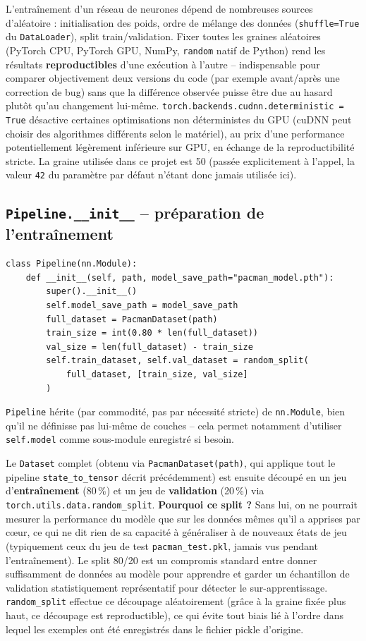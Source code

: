 \documentclass[a4paper,12pt]{article}
\begin{document}
L'entraînement d'un réseau de neurones dépend de nombreuses sources
d'aléatoire : initialisation des poids, ordre de mélange des données
(\texttt{shuffle=True} du \texttt{DataLoader}), split train/validation.
Fixer toutes les graines aléatoires (PyTorch CPU, PyTorch GPU, NumPy,
\texttt{random} natif de Python) rend les résultats
\textbf{reproductibles} d'une exécution à l'autre -- indispensable pour
comparer objectivement deux versions du code (par exemple avant/après une
correction de bug) sans que la différence observée puisse être due au
hasard plutôt qu'au changement lui-même.
\texttt{torch.backends.cudnn.deterministic = True} désactive certaines
optimisations non déterministes du GPU (cuDNN peut choisir des
algorithmes différents selon le matériel), au prix d'une performance
potentiellement légèrement inférieure sur GPU, en échange de la
reproductibilité stricte. La graine utilisée dans ce projet est 50
(passée explicitement à l'appel, la valeur \texttt{42} du paramètre par
défaut n'étant donc jamais utilisée ici).

\subsection{\texttt{Pipeline.\_\_init\_\_} -- préparation de l'entraînement}

\begin{lstlisting}
class Pipeline(nn.Module):
    def __init__(self, path, model_save_path="pacman_model.pth"):
        super().__init__()
        self.model_save_path = model_save_path
        full_dataset = PacmanDataset(path)
        train_size = int(0.80 * len(full_dataset))
        val_size = len(full_dataset) - train_size
        self.train_dataset, self.val_dataset = random_split(
            full_dataset, [train_size, val_size]
        )
\end{lstlisting}

\texttt{Pipeline} hérite (par commodité, pas par nécessité stricte) de
\texttt{nn.Module}, bien qu'il ne définisse pas lui-même de couches --
cela permet notamment d'utiliser \texttt{self.model} comme sous-module
enregistré si besoin.

Le \texttt{Dataset} complet (obtenu via \texttt{PacmanDataset(path)}, qui
applique tout le pipeline \texttt{state\_to\_tensor} décrit
précédemment) est ensuite découpé en un jeu d'\textbf{entraînement} (80\,\%)
et un jeu de \textbf{validation} (20\,\%) via
\texttt{torch.utils.data.random\_split}. \textbf{Pourquoi ce split ?} Sans
lui, on ne pourrait mesurer la performance du modèle que sur les données
mêmes qu'il a apprises par c\oe{}ur, ce qui ne dit rien de sa capacité à
généraliser à de nouveaux états de jeu (typiquement ceux du jeu de test
\texttt{pacman\_test.pkl}, jamais vus pendant l'entraînement). Le split
80/20 est un compromis standard entre donner suffisamment de données au
modèle pour apprendre et garder un échantillon de validation
statistiquement représentatif pour détecter le sur-apprentissage.
\texttt{random\_split} effectue ce découpage aléatoirement (grâce à la
graine fixée plus haut, ce découpage est reproductible), ce qui évite tout
biais lié à l'ordre dans lequel les exemples ont été enregistrés dans le
fichier pickle d'origine.
\end{document}
